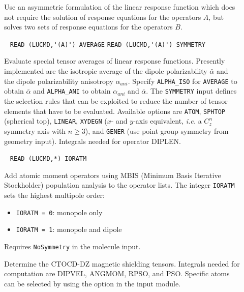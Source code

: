\begin{description}
\item[] 
Use an asymmetric formulation of the linear response function which
does not require the solution of response equations for the operators $A$, 
but solves two sets of response equations for the operators $B$.
%
%
%
\item[] \verb| |\newline
   \verb|READ (LUCMD,'(A)') AVERAGE|\newline
   \verb|READ (LUCMD,'(A)') SYMMETRY|

Evaluate special tensor averages of linear response functions.
Presently implemented are the isotropic average of the dipole polarizability
$\bar{\alpha}$ and the dipole polarizability anisotropy $\alpha_{ani}$.
Specify \verb+ALPHA_ISO+ for \verb+AVERAGE+ to obtain $\bar{\alpha}$ and
\verb+ALPHA_ANI+ to obtain $\alpha_{ani}$ and $\bar{\alpha}$.
The \verb+SYMMETRY+ input defines the selection rules that can be
exploited to reduce the number of tensor elements that have to be
evaluated. Available options are
\verb+ATOM+, \verb+SPHTOP+ (spherical top), \verb+LINEAR+,
\verb+XYDEGN+ ($x$- and $y$-axis equivalent, {\it i.e.\/} a $C_z^n$
symmetry axis with $n \ge 3$),  and \verb+GENER+ (use point
group symmetry from geometry input).
Integrals needed for operator DIPLEN.

\item[] \verb| |\newline
   \verb|READ (LUCMD,*) IORATM|

Add atomic moment operators using MBIS (Minimum Basis Iterative Stockholder) population analysis to the operator lists.
The integer \verb|IORATM| sets the highest multipole order:
\begin{itemize}
  \item \verb|IORATM = 0|: monopole only 
  \item \verb|IORATM = 1|: monopole and dipole 
\end{itemize}
Requires \verb|NoSymmetry| in the molecule input.

\item[]
Determine the CTOCD-DZ magnetic shielding tensors. Integrals
needed for computation are DIPVEL, ANGMOM, RPSO, and PSO. Specific atoms can
be selected by using the option  in the  input 
module.


\end{description}
